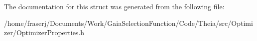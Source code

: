 The documentation for this struct was generated from the following file\+:\begin{DoxyCompactItemize}
\item 
/home/fraserj/\+Documents/\+Work/\+Gaia\+Selection\+Function/\+Code/\+Theia/src/\+Optimizer/Optimizer\+Properties.\+h\end{DoxyCompactItemize}
